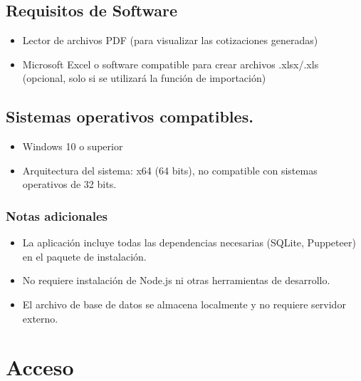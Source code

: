 \documentclass{Pretexto/bluereport}
\begin{document}
\begin{center}
\begin{tcolorbox}[
    enhanced,
    boxrule=2pt,
    colframe=primaryblue,
    colback=light,
    rounded corners=5pt,
    width=0.98\textwidth
]
\begin{tabular}{>{\raggedright\bfseries}p{3.5cm} 
                >{\raggedright\arraybackslash}p{9.5cm}}
\end{tabular}
\end{tcolorbox}
\end{center}


\subsection{Requisitos de Software}
\begin{itemize}[itemsep=0pt]
    \item Lector de archivos PDF (para visualizar las cotizaciones generadas)
    \item Microsoft Excel o software compatible para crear archivos .xlsx/.xls (opcional, solo si se utilizará la función de importación)
\end{itemize}

\subsection{Sistemas operativos compatibles.}
\begin{itemize}[itemsep=0pt]
    \item Windows 10 o superior 
    \item Arquitectura del sistema: x64 (64 bits), no compatible con sistemas operativos de 32 bits.
\end{itemize}

\subsubsection{Notas adicionales}
\begin{itemize}[itemsep=0pt]
    \item La aplicación incluye todas las dependencias necesarias (SQLite, Puppeteer) en el paquete de instalación.
    \item No requiere instalación de Node.js ni otras herramientas de desarrollo.
    \item El archivo de base de datos se almacena localmente y no requiere servidor externo.
\end{itemize}


\section{Acceso}
\end{document}
